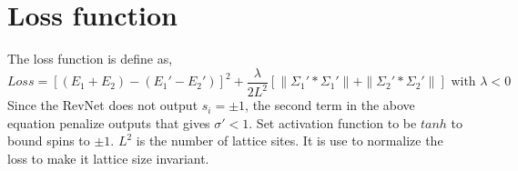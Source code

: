 \documentclass{article}
\begin{document}
\section{Loss function}
The loss function is define as,
\begin{equation}
Loss = [(E_1+E_2) - (E_1'-E_2')]^2 + 
      \frac{\lambda}{2 L^2} \left[ \| \Sigma_1' *\Sigma_1' \| +
                     \| \Sigma_2' *\Sigma_2' \| \right]
\mbox{ with }\lambda<0
\end{equation}
Since the RevNet does not output $s_i = \pm 1$, the second term in the above
equation penalize outputs that gives $\sigma'<1$.
Set activation function to be $tanh$ to bound spins to $\pm 1$.
$L^2$ is the number of lattice sites. It is use to normalize the loss to make it
lattice size invariant.
\end{document}
